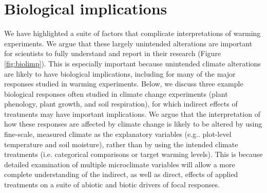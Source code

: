 \documentclass{article}
\begin{document}
\section* {Biological implications}
\par We have highlighted a suite of factors that complicate interpretations of warming experiments. We argue that these largely unintended alterations are important for scientists to fully understand and report in their research (Figure \ref{fig:biolimp}). This is especially important because unintended climate alterations are likely to have biological implications, including for many of the major responses studied in warming experiments. Below, we discuss three example biological responses often studied in climate change experiments (plant phenology, plant growth, and soil respiration), for which indirect effects of treatments may have important implications. We argue that the interpretation of how these responses are affected by climate change is likely to be altered by using fine-scale, measured climate as the explanatory variables (e.g.. plot-level temperature and soil moisture), rather than by using the intended climate treatments (i.e. categorical comparisons or target warming levels). This is because detailed examination of multiple microclimate variables will allow a more complete understanding of the indirect, as well as direct, effects of applied treatments on a suite of abiotic and biotic drivers of focal responses.
\end{document}
